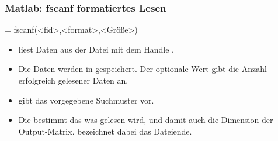 \documentclass[hyperref={xetex}]{beamer}
\begin{document}
%
%
\begin{frame}[fragile]\frametitle{Matlab: fscanf formatiertes Lesen}
\begin{matlabin}
 = fscanf(<fid>,<format>,<Größe>)
\end{matlabin}
\begin{itemize}
\item {} liest Daten aus der Datei mit dem Handle
  . 
\item Die Daten werden in  gespeichert. Der optionale Wert
   gibt die Anzahl erfolgreich gelesener Daten an.
\item {} gibt das vorgegebene Suchmuster vor.
\item Die  bestimmt das was gelesen wird, und damit auch die Dimension der Output-Matrix.  bezeichnet dabei das Dateiende.
\end{itemize}
\end{frame}
\end{document}
